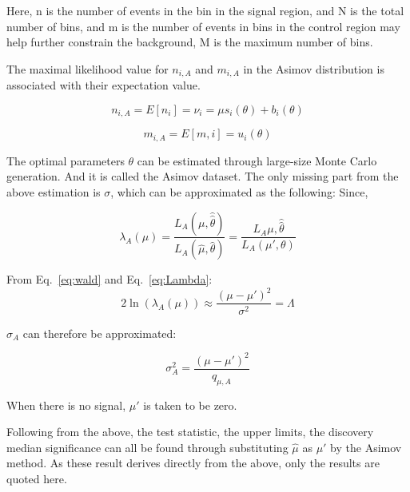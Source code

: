 Here, n is the number of events in the bin in the signal region, and N is the total number of bins, and m is the number of events in bins in the control region may help further constrain the background, M is the maximum number of bins. 

The maximal likelihood value for $n_{i,A}$ and $m_{i,A}$ in the Asimov distribution is associated with their expectation value. 

\begin{equation}
    n_{i,A} = E[n_{i}] = \nu_{i} = \mu s_{i}(\theta) + b_{i}(\theta)
\end{equation}

\begin{equation}
    m_{i,A} = E[m,i] = u_{i}(\theta)
\end{equation}

The optimal parameters $\theta$ can be estimated through large-size Monte Carlo generation. And it is called the Asimov dataset.
The only missing part from the above estimation is $\sigma$, which can be approximated as the following: 
Since, 

\begin{equation}
    \lambda_{A}(\mu) = \frac{L_{A}(\mu, \hat{\hat{\theta}})}{L_{A}(\hat{\mu}, \hat{\theta})}
= \frac{L_{A}{\mu, \hat{\hat{\theta}}}}{L_{A}(\mu', \theta)}
\end{equation}


From Eq.~\ref{eq:wald} and Eq.~\ref{eq:Lambda}:
\begin{equation}
2\ln(\lambda_{A}(\mu)) \approx \frac{(\mu-\mu')^{2}}{\sigma^{2}}=\Lambda
\end{equation}

$\sigma_{A}$ can therefore be approximated:

\begin{equation}
    \sigma_{A}^{2} = \frac{(\mu-\mu')^{2}}{q_{\mu,A}}
\end{equation}

When there is no signal, $\mu'$ is taken to be zero. 

Following from the above, the test statistic, the upper limits, the discovery median significance can all be found through substituting $\hat{\mu}$ as $\mu'$ by the Asimov method. As these result derives directly from the above, only the results are quoted here. 

